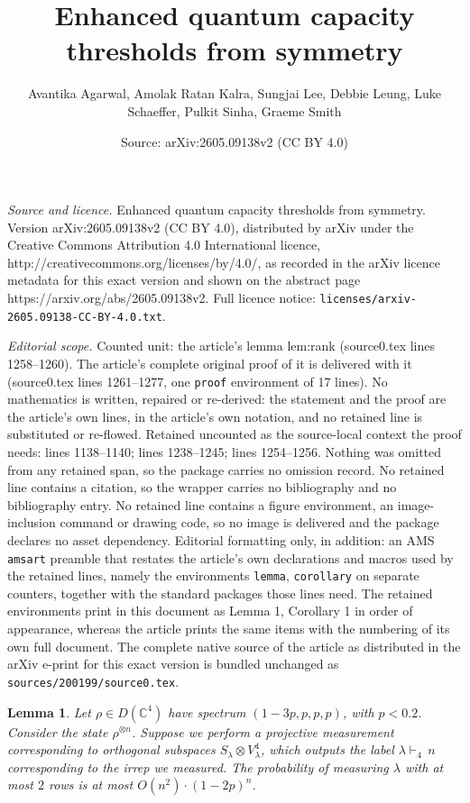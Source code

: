 \documentclass[10pt,a4paper]{amsart}
\title{\textsf{Enhanced quantum capacity thresholds from symmetry}}
\author{Avantika Agarwal, Amolak Ratan Kalra, Sungjai Lee, Debbie Leung, Luke Schaeffer, Pulkit Sinha, Graeme Smith}
\date{Source: arXiv:2605.09138v2 (CC BY 4.0)}
\newtheorem{lemma}{Lemma}
\begin{document}
\maketitle

\noindent\emph{Source and licence.} \textsf{Enhanced quantum capacity thresholds from symmetry}. Version arXiv:2605.09138v2 (CC BY 4.0), distributed by arXiv under the Creative Commons Attribution 4.0 International licence, http://creativecommons.org/licenses/by/4.0/, as recorded in the arXiv licence metadata for this exact version and shown on the abstract page https://arxiv.org/abs/2605.09138v2. Full licence notice: \texttt{licenses/arxiv-2605.09138-CC-BY-4.0.txt}.\par\smallskip

\noindent\textit{Editorial scope.} Counted unit: the article's lemma lem:rank (source0.tex lines 1258--1260). The article's complete original proof of it is delivered with it (source0.tex lines 1261--1277, one \texttt{proof} environment of 17 lines). No mathematics is written, repaired or re-derived: the statement and the proof are the article's own lines, in the article's own notation, and no retained line is substituted or re-flowed.  Retained uncounted as the source-local context the proof needs: lines 1138--1140; lines 1238--1245; lines 1254--1256.  Nothing was omitted from any retained span, so the package carries no omission record.  No retained line contains a citation, so the wrapper carries no bibliography and no bibliography entry.  No retained line contains a figure environment, an image-inclusion command or drawing code, so no image is delivered and the package declares no asset dependency.  Editorial formatting only, in addition: an AMS \texttt{amsart} preamble that restates the article's own declarations and macros used by the retained lines, namely the environments \texttt{lemma}, \texttt{corollary} on separate counters, together with the standard packages those lines need.  The retained environments print in this document as Lemma 1, Corollary 1 in order of appearance, whereas the article prints the same items with the numbering of its own full document.  The complete native source of the article as distributed in the arXiv e-print for this exact version is bundled unchanged as \texttt{sources/200199/source0.tex}.
\begin{lemma}\label{lem:two_row_prob}
    Let $\rho\in D(\mathbb C^4)$ have spectrum $(1-3p,p,p,p)$, with $p<0.2$. Consider the state $\rho^{\otimes n}$. Suppose we perform a projective measurement corresponding to orthogonal subspaces $S_\lambda\otimes V^4_{\lambda}$, which outputs the label $\lambda\vdash_4\,n$ corresponding to the irrep we measured. The probability of measuring $\lambda$ with at most $2$ rows is at most $O(n^2)\cdot (1-2p)^n$.
\end{lemma}
\end{document}

